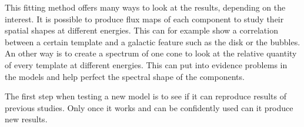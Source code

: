 This fitting method offers many ways to look at the results, depending on the interest. It is possible to produce flux maps of each component to study their spatial shapes at different energies. This can for example show a correlation between a certain template and a galactic feature such as the disk or the bubbles. An other way is to create a spectrum of one cone to look at the relative quantity of every template at different energies. This can put into evidence problems in the models and help perfect the spectral shape of the components.

The first step when testing a new model is to see if it can reproduce results of previous studies. Only once it works and can be confidently used can it produce new results.




